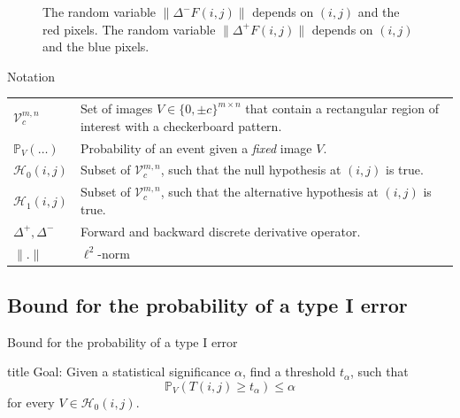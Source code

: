 \documentclass[presentation]{beamer}
\newcommand{\norm}[1]{\lVert#1\rVert}
\begin{document}
\begin{frame}
	\begin{figure}
		\centering
		\caption{The random variable $\norm{\Delta^- F(i, j)}$ depends on $(i, j)$ and the red pixels. The random variable $\norm{\Delta^+ F(i, j)}$ depends on $(i, j)$ and the blue pixels.}
	\end{figure}
\end{frame}

\begin{frame}{Notation}
	\begin{tabular}{p{2cm}p{9cm}}
		$\mathcal{V}_c^{m, n}$ & Set of images $V \in \{ 0, \pm c \}^{m \times n}$ that contain a rectangular region of interest with a checkerboard pattern. \\
		$\mathbb{P}_V( \ldots )$ & Probability of an event given a \emph{fixed} image $V$. \\
		$\mathcal{H}_0(i, j)$ & Subset of $\mathcal{V}_c^{m, n}$, such that the null hypothesis at $(i, j)$ is true. \\
		$\mathcal{H}_1(i, j)$ & Subset of $\mathcal{V}_c^{m, n}$, such that the alternative hypothesis at $(i, j)$ is true. \\
		$\Delta^+, \Delta^-$ & Forward and backward discrete derivative operator. \\
		$\norm{.}$ & $\ell^2$-norm \\
	\end{tabular}
\end{frame}

\subsection{Bound for the probability of a type I error}

\begin{frame}{Bound for the probability of a type I error}
	\begin{beamercolorbox}[sep=8pt,center,shadow=true,rounded=true]{title}
		Goal: Given a statistical significance $\alpha$, find a threshold $t_\alpha$, such that
		\begin{equation*}
			\mathbb{P}_V( T(i, j) \geq t_\alpha ) \leq \alpha
		\end{equation*}
		for every $V \in \mathcal{H}_0(i, j)$.
	\end{beamercolorbox}
\end{frame}
\end{document}
